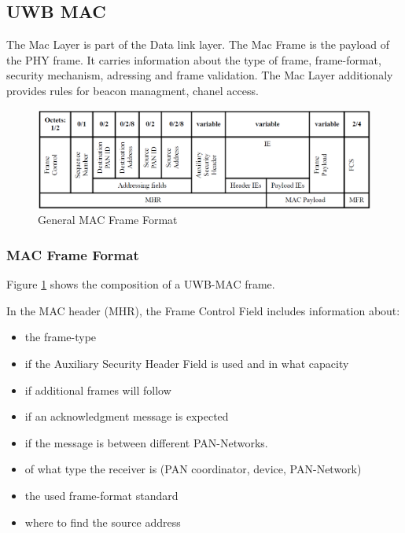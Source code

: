 \subsection{UWB MAC}
\label{sec:UWB MAC}

The Mac Layer is part of the Data link layer.
The Mac Frame is the payload of the PHY frame. It carries information about the type of frame, frame-format, security mechanism, adressing and frame validation.
The Mac Layer additionaly provides rules for beacon managment, chanel access.

\begin{figure}[ht!]
	\centering
	\includegraphics[width=\linewidth]{graphics/general_MAC_Frame_Format.png}
	\caption{General MAC Frame Format \cite{IEEE4-2020-7}}
	\label{f:MAC Frame Format}
\end{figure}


\subsubsection{MAC Frame Format}

Figure \ref{f:MAC Frame Format} shows the composition of a UWB-MAC frame.

In the MAC header (MHR), the Frame Control Field includes information about:

\begin{itemize}
  \item the frame-type
  \item if the Auxiliary Security Header Field is used and in what capacity
  \item if additional frames will follow
  \item if an acknowledgment message is expected
  \item if the message is between different PAN-Networks.
  \item of what type the receiver is (PAN coordinator, device, PAN-Network)
  \item the used frame-format standard
  \item where to find the source address
\end{itemize}

